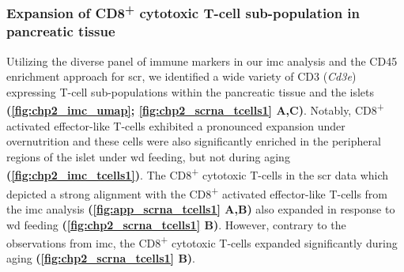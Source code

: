 \subsubsection{Expansion of CD8\textsuperscript{+} cytotoxic T-cell sub-population in pancreatic tissue}
Utilizing the diverse panel of immune markers in our \gls{imc} analysis and the CD45 enrichment approach for \gls{scr}, we identified a wide variety of CD3 (\textit{Cd3e}) expressing T-cell sub-populations within the pancreatic tissue and the islets \textbf{(\autoref{fig:chp2_imc_umap}; \autoref{fig:chp2_scrna_tcells1} A,C)}. Notably, CD8\textsuperscript{+} activated effector-like T-cells exhibited a pronounced expansion under overnutrition and these cells were also significantly enriched in the peripheral regions of the islet under \gls{wd} feeding, but not during aging \textbf{(\autoref{fig:chp2_imc_tcells1})}. The CD8\textsuperscript{+} cytotoxic T-cells in the \gls{scr} data which depicted a strong alignment with the CD8\textsuperscript{+} activated effector-like T-cells from the \gls{imc} analysis \textbf{(\autoref{fig:app_scrna_tcells1} A,B)} also expanded in response to \gls{wd} feeding \textbf{(\autoref{fig:chp2_scrna_tcells1} B)}. However, contrary to the observations from \gls{imc}, the CD8\textsuperscript{+} cytotoxic T-cells expanded significantly during aging \textbf{(\autoref{fig:chp2_scrna_tcells1} B)}.

